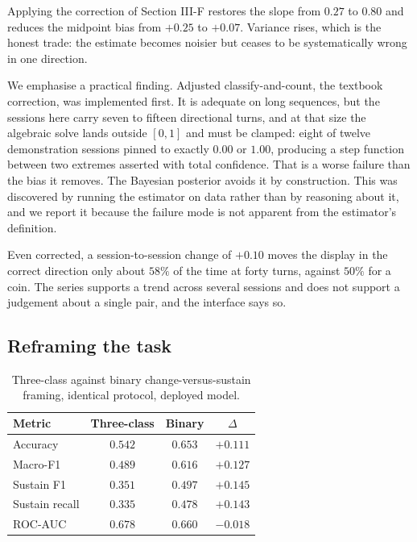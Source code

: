 \documentclass[conference]{IEEEtran}
\begin{document}
Applying the correction of Section III-F restores the slope from $0.27$ to
$0.80$ and reduces the midpoint bias from $+0.25$ to $+0.07$. Variance rises,
which is the honest trade: the estimate becomes noisier but ceases to be
systematically wrong in one direction.

We emphasise a practical finding. Adjusted classify-and-count, the textbook
correction, was implemented first. It is adequate on long sequences, but the
sessions here carry seven to fifteen directional turns, and at that size the
algebraic solve lands outside $[0,1]$ and must be clamped: eight of twelve
demonstration sessions pinned to exactly $0.00$ or $1.00$, producing a step
function between two extremes asserted with total confidence. That is a worse
failure than the bias it removes. The Bayesian posterior avoids it by
construction. This was discovered by running the estimator on data rather than
by reasoning about it, and we report it because the failure mode is not
apparent from the estimator's definition.

Even corrected, a session-to-session change of $+0.10$ moves the display in
the correct direction only about $58\%$ of the time at forty turns, against
$50\%$ for a coin. The series supports a trend across several sessions and does
not support a judgement about a single pair, and the interface says so.

\subsection{Reframing the task}

\begin{table}[t]
\caption{Three-class against binary change-versus-sustain framing, identical
protocol, deployed model.}
\label{tab:binary}
\centering
\footnotesize
\begin{tabular}{lccc}
\toprule
Metric & Three-class & Binary & $\Delta$ \\
\midrule
Accuracy        & $0.542$ & $0.653$ & $+0.111$ \\
Macro-F1        & $0.489$ & $0.616$ & $+0.127$ \\
Sustain F1      & $0.351$ & $0.497$ & $+0.145$ \\
Sustain recall  & $0.335$ & $0.478$ & $+0.143$ \\
ROC-AUC         & $0.678$ & $0.660$ & $-0.018$ \\
\bottomrule
\end{tabular}
\end{table}
\end{document}
